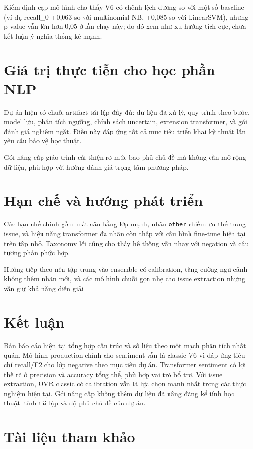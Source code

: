 ﻿\documentclass[12pt,a4paper]{article}
\begin{document}
Kiểm định cặp mô hình cho thấy V6 có chênh lệch dương so với một số baseline (ví dụ recall\_0 +0,063 so với multinomial NB, +0,085 so với LinearSVM), nhưng p-value vẫn lớn hơn 0,05 ở lần chạy này; do đó xem như xu hướng tích cực, chưa kết luận ý nghĩa thống kê mạnh.

\section{Giá trị thực tiễn cho học phần NLP}
Dự án hiện có chuỗi artifact tái lập đầy đủ: dữ liệu đã xử lý, quy trình theo bước, model lưu, phân tích ngưỡng, chính sách uncertain, extension transformer, và gói đánh giá nghiêm ngặt. Điều này đáp ứng tốt cả mục tiêu triển khai kỹ thuật lẫn yêu cầu bảo vệ học thuật.

Gói nâng cấp giáo trình cải thiện rõ mức bao phủ chủ đề mà không cần mở rộng dữ liệu, phù hợp với hướng đánh giá trọng tâm phương pháp.

\section{Hạn chế và hướng phát triển}
Các hạn chế chính gồm mất cân bằng lớp mạnh, nhãn \texttt{other} chiếm ưu thế trong issue, và hiệu năng transformer đa nhãn còn thấp với cấu hình fine-tune hiện tại trên tập nhỏ. Taxonomy lỗi cũng cho thấy hệ thống vẫn nhạy với negation và câu tương phản phức hợp.

Hướng tiếp theo nên tập trung vào ensemble có calibration, tăng cường ngữ cảnh không thêm nhãn mới, và các mô hình chuỗi gọn nhẹ cho issue extraction nhưng vẫn giữ khả năng diễn giải.

\section{Kết luận}
Bản báo cáo hiện tại tổng hợp cấu trúc và số liệu theo một mạch phân tích nhất quán. Mô hình production chính cho sentiment vẫn là classic V6 vì đáp ứng tiêu chí recall/F2 cho lớp negative theo mục tiêu dự án. Transformer sentiment có lợi thế rõ ở precision và accuracy tổng thể, phù hợp vai trò bổ trợ. Với issue extraction, OVR classic có calibration vẫn là lựa chọn mạnh nhất trong các thực nghiệm hiện tại. Gói nâng cấp không thêm dữ liệu đã nâng đáng kể tính học thuật, tính tái lập và độ phủ chủ đề của dự án.

\clearpage
\section*{Tài liệu tham khảo}
\end{document}
